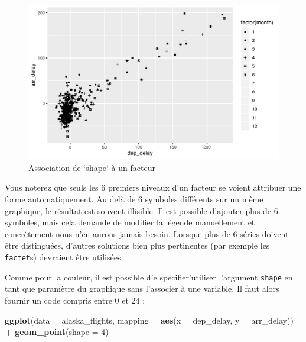 \documentclass[a4paperpaper,]{article}
\newenvironment{Shaded}{\begin{snugshade}}{\end{snugshade}}
\newcommand{\KeywordTok}[1]{\textcolor[rgb]{0.13,0.29,0.53}{\textbf{#1}}}
\newcommand{\DataTypeTok}[1]{\textcolor[rgb]{0.13,0.29,0.53}{#1}}
\newcommand{\DecValTok}[1]{\textcolor[rgb]{0.00,0.00,0.81}{#1}}
\newcommand{\StringTok}[1]{\textcolor[rgb]{0.31,0.60,0.02}{#1}}
\newcommand{\OperatorTok}[1]{\textcolor[rgb]{0.81,0.36,0.00}{\textbf{#1}}}
\newcommand{\NormalTok}[1]{#1}
\theoremstyle{definition}
\theoremstyle{definition}
\theoremstyle{definition}
\theoremstyle{remark}
\begin{document}
\begin{figure}[htpb]

{\centering \includegraphics[width=0.9\linewidth]{figure/shapeplot-1} 

}

\caption{Association de `shape` à un facteur}\label{fig:shapeplot}
\end{figure}

Vous noterez que seuls les 6 premiers niveaux d'un facteur se voient
attribuer une forme automatiquement. Au delà de 6 symboles différents
sur un même graphique, le résultat est souvent illisible. Il est
possible d'ajouter plus de 6 symboles, mais cela demande de modifier la
légende manuellement et concrètement nous n'en aurons jamais besoin.
Lorsque plus de 6 séries doivent être distinguées, d'autres solutions
bien plus pertinentes (par exemple les \texttt{factet}s) devraient être
utilisées.

Comme pour la couleur, il est possible d'e spécifier'utiliser l'argument
\texttt{shape} en tant que paramètre du graphique sans l'associer à une
variable. Il faut alors fournir un code compris entre 0 et 24 :

\begin{Shaded}
\begin{Highlighting}[]
\KeywordTok{ggplot}\NormalTok{(}\DataTypeTok{data =}\NormalTok{ alaska_flights, }\DataTypeTok{mapping =} \KeywordTok{aes}\NormalTok{(}\DataTypeTok{x =}\NormalTok{ dep_delay, }\DataTypeTok{y =}\NormalTok{ arr_delay)) }\OperatorTok{+}
\StringTok{  }\KeywordTok{geom_point}\NormalTok{(}\DataTypeTok{shape =} \DecValTok{4}\NormalTok{)}
\end{Highlighting}
\end{Shaded}
\end{document}
